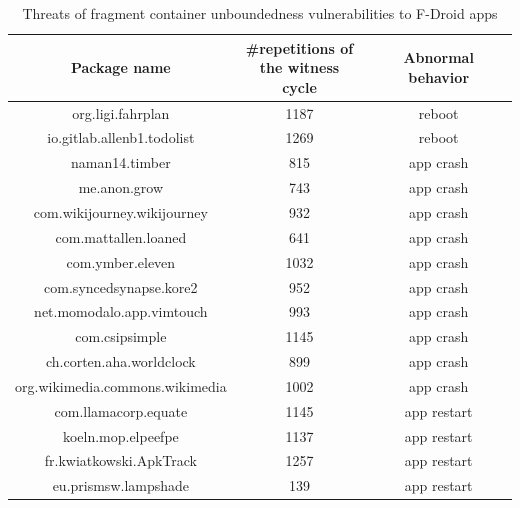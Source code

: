 \begin{table}[htbp]
	\begin{center}   
		\begin{tabular}{|c|c|c|}   
		\hline   
		 Package name & \shortstack{\#repetitions of \\ the witness cycle} & Abnormal behavior\\   
			\hline    
			\hline    org.ligi.fahrplan & 1187 & reboot  \\ 
			\hline    io.gitlab.allenb1.todolist & 1269 & reboot  \\ 
			\hline    naman14.timber & 815 & app crash  \\ 
			\hline   me.anon.grow & 743 & app crash  \\ 
			\hline    com.wikijourney.wikijourney & 932 & app crash  \\ 
			\hline    com.mattallen.loaned & 641 & app crash  \\ 
			\hline    com.ymber.eleven & 1032 & app crash  \\ 
			\hline   com.syncedsynapse.kore2 & 952 & app crash  \\ 
			\hline   net.momodalo.app.vimtouch & 993 & app crash  \\ 
			\hline    com.csipsimple & 1145 & app crash  \\ 
			\hline    ch.corten.aha.worldclock & 899 & app crash  \\ 
			\hline     org.wikimedia.commons.wikimedia & 1002 & app crash  \\ 
			\hline     com.llamacorp.equate & 1145 & app restart  \\ 
			\hline     koeln.mop.elpeefpe & 1137 & app restart  \\ 
			\hline    fr.kwiatkowski.ApkTrack & 1257 & app restart  \\ 
			\hline     eu.prismsw.lampshade & 139 & app restart  \\ 
			\hline
		\end{tabular}		
		\caption{Threats of fragment container unboundedness vulnerabilities to F-Droid apps}
		 \label{tab:threat-fd-f} 
\end{center}
\end{table}

